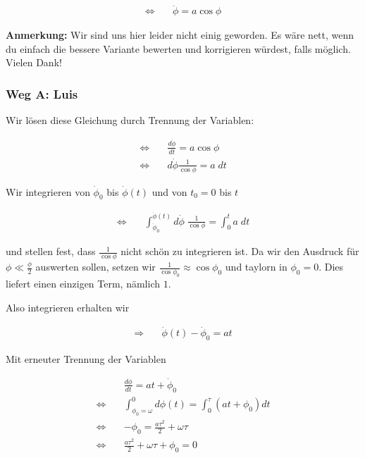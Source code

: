 \documentclass[a4paper,german,12pt,smallheadings]{scrartcl}
\begin{document}
\begin{align*}
  \Leftrightarrow\quad&\ddot{\phi} = a \cos \phi
\end{align*}

\textbf{Anmerkung:} Wir sind uns hier leider nicht einig geworden. Es wäre
nett, wenn du einfach die bessere Variante bewerten und korrigieren würdest,
falls möglich. Vielen Dank!

\subsubsection*{Weg A: Luis}

Wir lösen diese Gleichung durch Trennung der Variablen:

\begin{align*}
  \Leftrightarrow\quad&\frac{d \dot{\phi}}{dt} = a \cos \phi\\
  \Leftrightarrow\quad&d \dot{\phi} \frac{1}{\cos \phi} = a \; dt
\end{align*}

Wir integrieren von $\dot{\phi}_0$ bis $\dot{\phi}(t)$ und von $t_0 = 0$ bis $t$

\begin{align*}
  \Leftrightarrow\quad&\int_{\dot{\phi}_0}^{\dot{\phi}(t)} d \dot{\phi} \; \frac{1}{\cos \phi} = \int_0^{t} a \; dt
\end{align*}

und stellen fest, dass $\frac{1}{\cos \phi}$ nicht schön zu integrieren ist. Da
wir den Ausdruck für $\phi \ll \frac{\phi}{2}$ auswerten sollen, setzen wir
$\frac{1}{\cos \phi_0} \approx \cos \phi_0$ und taylorn in $\phi_0 = 0$. Dies
liefert einen einzigen Term, nämlich $1$.

Also integrieren erhalten wir

\begin{align*}
  \Rightarrow\quad&\dot{\phi}(t) -\dot{\phi}_0 = at
\end{align*}

Mit erneuter Trennung der Variablen

\begin{align*}
  &\frac{d \phi}{dt} = at + \dot{\phi}_0\\
  \Leftrightarrow\quad& \int_{\phi_0 = \omega}^{0} d\phi(t) = \int_0^{\tau}(at + \phi_0) dt\\
  \Leftrightarrow\quad& -\phi_0 = \frac{a \tau^2}{2} + \omega \tau \\
  \Leftrightarrow\quad& \frac{a \tau^2}{2} + \omega \tau + \phi_0 = 0
\end{align*}
\end{document}

